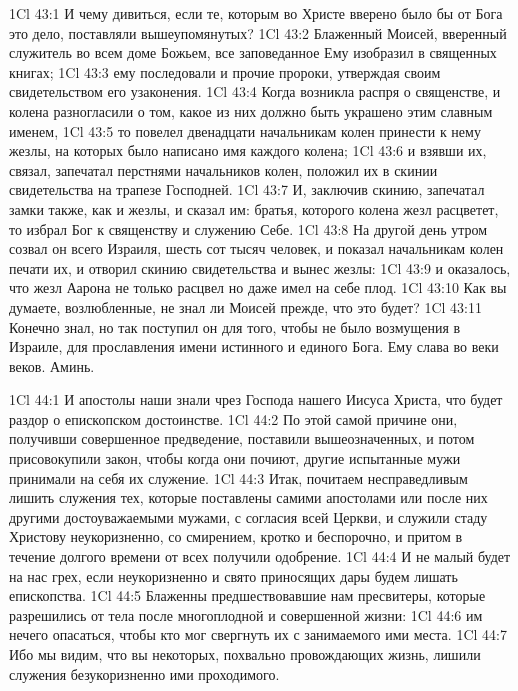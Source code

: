 \vs 1Cl 43:1
И чему дивиться, если те,
которым во Христе вверено было бы от Бога это дело, поставляли вышеупомянутых?
\vs 1Cl 43:2
Блаженный Моисей,
вверенный служитель во всем доме Божьем, все заповеданное Ему изобразил в
священных книгах;
\vs 1Cl 43:3
ему последовали и прочие
пророки, утверждая своим свидетельством его узаконения.
\vs 1Cl 43:4
Когда возникла распря о
священстве, и колена разногласили о том, какое из них должно быть украшено
этим славным именем,
\vs 1Cl 43:5
то повелел двенадцати
начальникам колен принести к нему жезлы, на которых было написано имя каждого
колена;
\vs 1Cl 43:6
и взявши их, связал,
запечатал перстнями начальников колен, положил их в скинии свидетельства на
трапезе Господней.
\vs 1Cl 43:7
И, заключив скинию,
запечатал замки также, как и жезлы, и сказал им: братья, которого колена жезл
расцветет, то избрал Бог к священству и служению Себе.
\vs 1Cl 43:8
На другой день утром
созвал он всего Израиля, шесть сот тысяч человек, и показал начальникам колен
печати их, и отворил скинию свидетельства и вынес жезлы:
\vs 1Cl 43:9
и оказалось, что жезл
Аарона не только расцвел но даже имел на себе плод.
\vs 1Cl 43:10
Как вы думаете,
возлюбленные, не знал ли Моисей прежде, что это будет?
\vs 1Cl 43:11
Конечно знал, но так
поступил он для того, чтобы не было возмущения в Израиле, для прославления
имени истинного и единого Бога. Ему слава во веки веков. Аминь.

\vs 1Cl 44:1
И апостолы наши знали
чрез Господа нашего Иисуса Христа, что будет раздор о епископском достоинстве.
\vs 1Cl 44:2
По этой самой причине они,
получивши совершенное предведение, поставили вышеозначенных, и потом
присовокупили закон, чтобы когда они почиют, другие испытанные мужи принимали
на себя их служение.
\vs 1Cl 44:3
Итак, почитаем
несправедливым лишить служения тех, которые поставлены самими апостолами или
после них другими достоуважаемыми мужами, с согласия всей Церкви, и служили
стаду Христову неукоризненно, со смирением, кротко и беспорочно, и притом в
течение долгого времени от всех получили одобрение.
\vs 1Cl 44:4
И не малый будет на нас
грех, если неукоризненно и свято приносящих дары будем лишать епископства.
\vs 1Cl 44:5
Блаженны предшествовавшие
нам пресвитеры, которые разрешились от тела после многоплодной и совершенной
жизни:
\vs 1Cl 44:6
им нечего опасаться, чтобы
кто мог свергнуть их с занимаемого ими места.
\vs 1Cl 44:7
Ибо мы видим, что вы
некоторых, похвально провождающих жизнь, лишили служения безукоризненно ими
проходимого.

